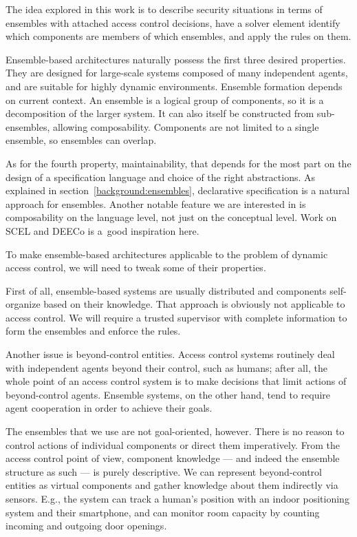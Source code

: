 The idea explored in this work is to describe security situations in terms of ensembles
with attached access control decisions, have a solver element identify which components
are members of which ensembles, and apply the rules on them.

Ensemble-based architectures naturally possess the first three desired properties. They
are designed for large-scale systems composed of many independent agents, and are
suitable for highly dynamic environments. Ensemble formation depends on current context.
An ensemble is a logical group of components, so it is a decomposition of the larger
system. It can also itself be constructed from sub-ensembles, allowing composability.
Components are not limited to a single ensemble, so ensembles can overlap.

As for the fourth property, maintainability, that depends for the most part on the
design of a specification language and choice of the right abstractions. As explained in
section~\ref{background:ensembles}, declarative specification is a natural approach for
ensembles. Another notable feature we are interested in is composability on the language
level, not just on the conceptual level. Work on SCEL and DEECo is a~good inspiration
here.

\medskip

To make ensemble-based architectures applicable to the problem of dynamic access
control, we will need to tweak some of their properties.

First of all, ensemble-based systems are usually distributed and components
self-organize based on their knowledge. That approach is obviously not applicable to
access control. We will require a trusted supervisor with complete information to form
the ensembles and enforce the rules.

Another issue is beyond-control entities. Access control systems routinely deal with
independent agents beyond their control, such as humans; after all, the whole point of
an access control system is to make decisions that limit actions of beyond-control
agents. Ensemble systems, on the other hand, tend to require agent cooperation in order
to achieve their goals.

The ensembles that we use are not goal-oriented, however. There is no reason to control
actions of individual components or direct them imperatively. From the access control
point of view, component knowledge --- and indeed the ensemble structure as such --- is
purely descriptive. We can represent beyond-control entities as virtual components and
gather knowledge about them indirectly via sensors. E.g., the system can track a human's
position with an indoor positioning system and their smartphone, and can monitor room
capacity by counting incoming and outgoing door openings.


